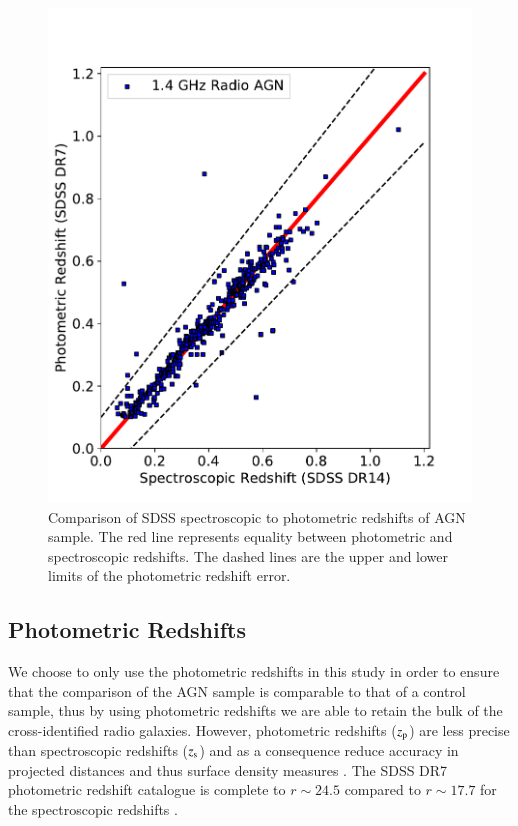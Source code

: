 \begin{figure}
 \begin{center}
  \includegraphics[width=0.8\columnwidth]{plots_chp2/photoz_specz_p.pdf}
  \caption[Comparison of SDSS spectroscopic to photometric redshifts of AGN sample]{Comparison of SDSS spectroscopic to photometric redshifts of AGN sample. The red line represents equality between photometric and spectroscopic redshifts. The dashed lines are the upper and lower limits of the photometric redshift error.}
  \label{fig:photoz-specz}
 \end{center}
\end{figure}

\subsection{Photometric Redshifts}
We choose to only use the photometric redshifts in this study in order to ensure that the comparison of the AGN sample is comparable to that of a control sample, thus by using photometric redshifts we are able to retain the bulk of the cross-identified radio galaxies. However, photometric redshifts ($z_{\rm p}$) are less precise than spectroscopic redshifts ($z_{\rm s}$) and as a consequence reduce accuracy in projected distances and thus surface density measures \citep{cooper2005}. The SDSS DR7 photometric redshift catalogue \citep{reis2012} is complete to $r \sim24.5$ compared to $r \sim17.7$ for the spectroscopic redshifts \citep{york2000}. 

